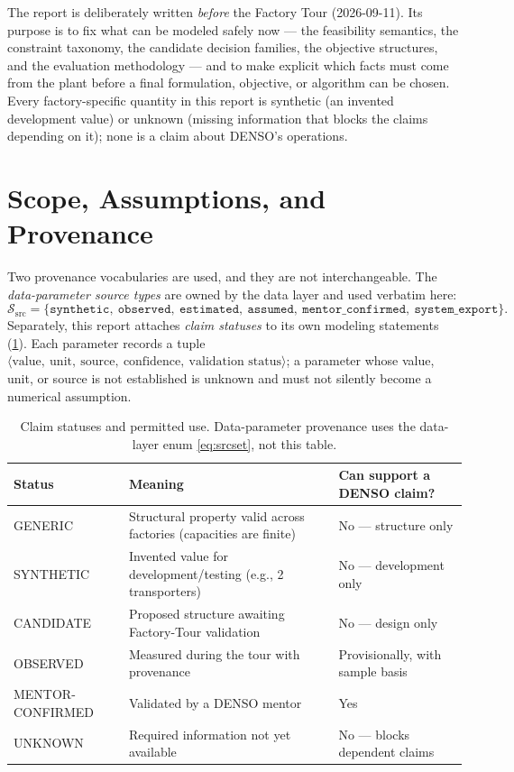 \documentclass[11pt,a4paper]{article}
\begin{document}
The report is deliberately written \emph{before} the Factory Tour
(2026-09-11). Its purpose is to fix what can be modeled safely now ---
the feasibility semantics, the constraint taxonomy, the candidate decision
families, the objective structures, and the evaluation methodology --- and to
make explicit which facts must come from the plant before a final
formulation, objective, or algorithm can be chosen. Every factory-specific
quantity in this report is synthetic (an invented development value) or
unknown (missing information that blocks the claims depending on it); none is
a claim about DENSO's operations.

\section{Scope, Assumptions, and Provenance}\label{sec:status}

Two provenance vocabularies are used, and they are not interchangeable. The
\emph{data-parameter source types} are owned by the data layer and used
verbatim here:
\begin{equation}\label{eq:srcset}
\mathcal{S}_{\mathrm{src}}
=\{\texttt{synthetic},\ \texttt{observed},\ \texttt{estimated},\
\texttt{assumed},\ \texttt{mentor\_confirmed},\ \texttt{system\_export}\}.
\end{equation}
Separately, this report attaches \emph{claim statuses} to its own modeling
statements (\cref{tab:status}). Each parameter records a tuple
$\langle \text{value},\ \text{unit},\ \text{source},\ \text{confidence},\
\text{validation status} \rangle$; a parameter whose value, unit, or source is
not established is unknown and must not silently become a numerical
assumption.

\begin{table}[htbp]
\centering\small
\caption{Claim statuses and permitted use. Data-parameter provenance uses
the data-layer enum \eqref{eq:srcset}, not this table.}
\label{tab:status}
\begin{tabular}{@{}p{3.1cm}p{6.9cm}p{4.2cm}@{}}
\toprule
Status & Meaning & Can support a DENSO claim? \\
\midrule
GENERIC & Structural property valid across factories (capacities are finite)
& No --- structure only \\
SYNTHETIC & Invented value for development/testing (e.g., 2 transporters)
& No --- development only \\
CANDIDATE & Proposed structure awaiting Factory-Tour validation & No ---
design only \\
OBSERVED & Measured during the tour with provenance & Provisionally, with
sample basis \\
MENTOR-CONFIRMED & Validated by a DENSO mentor & Yes \\
UNKNOWN & Required information not yet available & No --- blocks dependent
claims \\
\bottomrule
\end{tabular}
\end{table}
\end{document}
